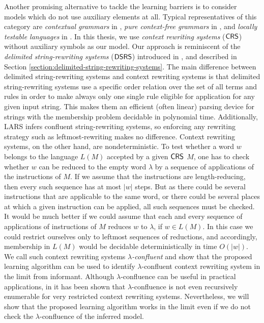 Another promising alternative to tackle the learning barriers is to consider models which do not use auxiliary elements at all. Typical representatives of this category are \emph{contextual grammars} in \cite{M69}, \emph{pure context-free grammars} in \cite{maurer1980pure}, and \emph{locally testable languages} in \cite{MR74,Zal72}. In this thesis, we use \emph{context rewriting systems} ($\mbox{\sf CRS\/}$) without auxiliary symbols as our model. Our approach is reminiscent of the \emph{delimited string-rewriting systems} ($\mbox{\sf DSRS}$) introduced in \cite{Eyraud2007}, and described in Section \ref{section:delimited-string-rewriting-systems}. The main difference between delimited string-rewriting systems and context rewriting systems is that delimited string-rewriting systems use a specific order relation over the set of all terms and rules in order to make always only one single rule eligible for application for any given input string. This makes them an efficient (often linear) parsing device for strings with the membership problem decidable in polynomial time. Additionally, LARS \cite{delaHiguera2010} infers confluent string-rewriting systems, so enforcing any rewriting strategy such as leftmost-rewriting makes no difference. Context rewriting systems, on the other hand, are nondeterministic. To test whether a word $w$ belongs to the language $L(M)$ accepted by a given $\mbox{\sf CRS\/}$ $M$, one has to check whether $w$ can be reduced to the empty word $\lambda$ by a sequence of applications of the instructions of $M$. If we assume that the instructions are length-reducing, then every such sequence has at most $|w|$ steps. But as there could be several instructions that are applicable to the same word, or there could be several places at which a given instruction can be applied, all such sequences must be checked. It would be much better if we could assume that each and every sequence of applications of instructions of $M$ reduces $w$ to $\lambda$, if $w \in L(M)$. In this case we could restrict ourselves only to leftmost sequences of reductions, and accordingly, membership in $L(M)$ would be decidable deterministically in time $O(|w|)$. We call such context rewriting systems \emph{$\lambda$-confluent} and show that the proposed learning algorithm can be used to identify $\lambda$-confluent context rewriting system in the limit from informant. Although $\lambda$-confluence can be useful in practical applications, in \cite{OM13} it has been shown that $\lambda$-confluence is not even recursively enumerable for very restricted context rewriting systems. Nevertheless, we will show that the proposed learning algorithm works in the limit even if we do not check the $\lambda$-confluence of the inferred model.

